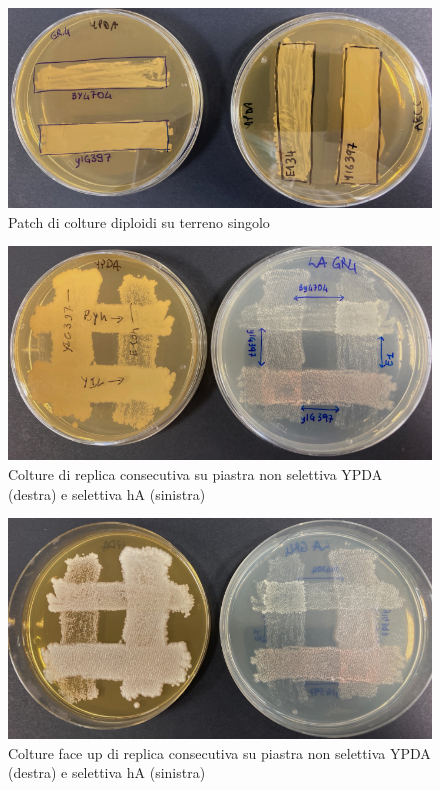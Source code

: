 		\begin{figure}[H]
			\centering
			\includegraphics[scale=0.4]{./Pics/SelezioneDiploidi/Giorno1-patch-terreno-ricco.png}
			\caption{Patch di colture diploidi su terreno singolo}
			\label{fig1}
		\end{figure}
	\begin{multicols}{2}
		\begin{figure}[H]
			\centering
		\includegraphics[scale=0.3]{./Pics/SelezioneDiploidi/Giorno2-selezione.png}
		\caption{Colture di replica consecutiva su piastra non selettiva YPDA (destra) e selettiva hA (sinistra)}
		\label{fig2}
	\end{figure}
	\columnbreak
		\begin{figure}[H]
			\centering
		\includegraphics[scale=0.275]{./Pics/SelezioneDiploidi/Giorno2-selezione-face-up.png}
		\caption{Colture face up di replica consecutiva su piastra non selettiva YPDA (destra) e selettiva hA (sinistra)}
		\label{fig3}
	\end{figure}
	\end{multicols}

